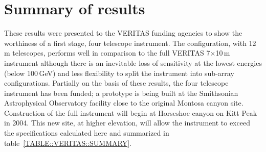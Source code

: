 \section{Summary of results}
\label{SEC::VERITAS::SUMMARY}

These results were presented to the VERITAS funding agencies to show
the worthiness of a first stage, four telescope instrument. The
configuration, with 12\,m telescopes, performs well in comparison to
the full VERITAS 7$\times$10\,m instrument although there is an
inevitable loss of sensitivity at the lowest energies (below 100\,GeV)
and less flexibility to split the instrument into sub-array
configurations. Partially on the basis of these results, the four
telescope instrument has been funded; a prototype is being built at
the Smithsonian Astrophysical Observatory facility close to the
original Montosa canyon site. Construction of the full instrument will
begin at Horseshoe canyon on Kitt Peak in 2004. This new site, at
higher elevation, will allow the instrument to exceed the
specifications calculated here and summarized in
table~\ref{TABLE::VERITAS::SUMMARY}.

